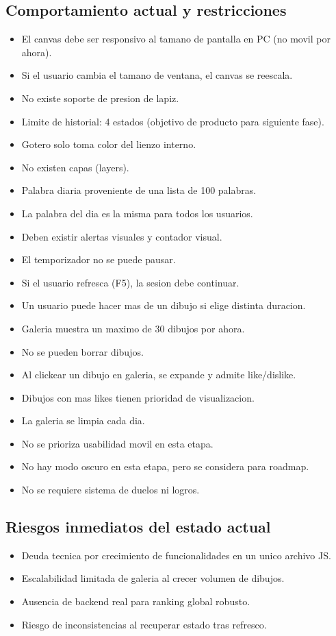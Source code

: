 \documentclass[12pt,a4paper]{article}
\begin{document}
\subsection{Comportamiento actual y restricciones}
\begin{itemize}
  \item El canvas debe ser responsivo al tamano de pantalla en PC (no movil por ahora).
  \item Si el usuario cambia el tamano de ventana, el canvas se reescala.
  \item No existe soporte de presion de lapiz.
  \item Limite de historial: 4 estados (objetivo de producto para siguiente fase).
  \item Gotero solo toma color del lienzo interno.
  \item No existen capas (layers).
  \item Palabra diaria proveniente de una lista de 100 palabras.
  \item La palabra del dia es la misma para todos los usuarios.
  \item Deben existir alertas visuales y contador visual.
  \item El temporizador no se puede pausar.
  \item Si el usuario refresca (F5), la sesion debe continuar.
  \item Un usuario puede hacer mas de un dibujo si elige distinta duracion.
  \item Galeria muestra un maximo de 30 dibujos por ahora.
  \item No se pueden borrar dibujos.
  \item Al clickear un dibujo en galeria, se expande y admite like/dislike.
  \item Dibujos con mas likes tienen prioridad de visualizacion.
  \item La galeria se limpia cada dia.
  \item No se prioriza usabilidad movil en esta etapa.
  \item No hay modo oscuro en esta etapa, pero se considera para roadmap.
  \item No se requiere sistema de duelos ni logros.
\end{itemize}

\subsection{Riesgos inmediatos del estado actual}
\begin{itemize}
  \item Deuda tecnica por crecimiento de funcionalidades en un unico archivo JS.
  \item Escalabilidad limitada de galeria al crecer volumen de dibujos.
  \item Ausencia de backend real para ranking global robusto.
  \item Riesgo de inconsistencias al recuperar estado tras refresco.
\end{itemize}
\end{document}
